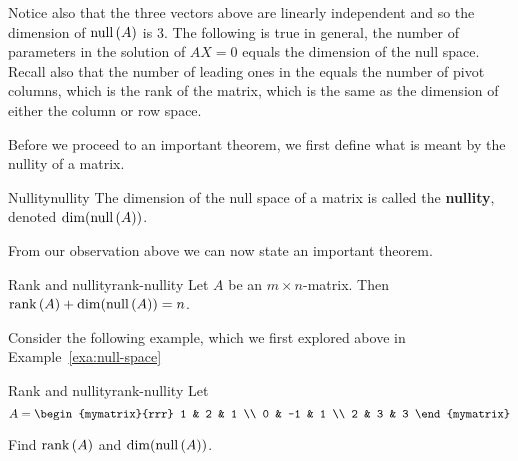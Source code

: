 Notice also that the three vectors above are linearly independent and
so the dimension of $\mbox{\rm null} \left(A\right) $ is 3. The following is true
in general, the number of parameters in the solution of $AX=0$ equals
the dimension of the null space. Recall also that the number of
leading ones in the {\rref} equals the number of pivot columns, which
is the rank of the matrix, which is the same as the dimension of
either the column or row space.

Before we proceed to an important theorem, we first define what is
meant by the nullity of a matrix.

\begin{definition}{Nullity}{nullity}
  The dimension of the null space of a matrix is called the
  \textbf{nullity}, denoted
  $\dim( \mbox{\rm null}\left(A\right))$.
\end{definition}

From our observation above we can now state an important theorem.

\begin{theorem}{Rank and nullity}{rank-nullity}
  Let $A$ be an $m\times n$-matrix. Then
  $\mbox{\rm rank}\left(A\right) + \dim( \mbox{\rm null}\left(A\right)) =n$.
\end{theorem}

Consider the following example, which we first explored above in
Example~\ref{exa:null-space}

\begin{example}{Rank and nullity}{rank-nullity}
  Let
  \begin{equation*}
    A=\begin{mymatrix}{rrr}
      1 & 2 & 1 \\
      0 & -1 & 1 \\
      2 & 3 & 3
    \end{mymatrix}
  \end{equation*}

  Find $\mbox{\rm rank}\left(A\right)$ and $\dim( \mbox{\rm null}\left(A\right))$.
\end{example}

